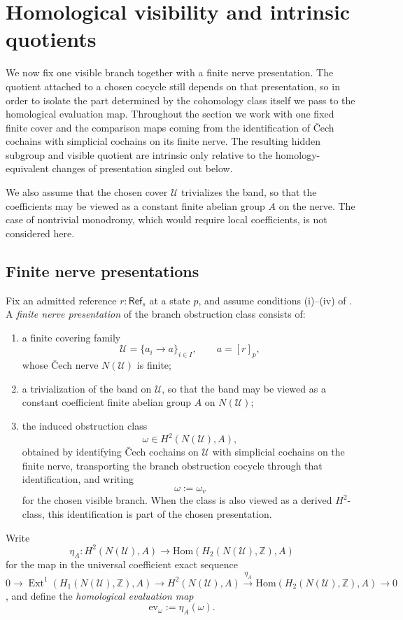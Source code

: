 \section{Homological visibility and intrinsic quotients}
\label{sec:homological-visibility}

We now fix one visible branch together with a finite nerve presentation. The quotient attached to a chosen cocycle still depends on that presentation, so in order to isolate the part determined by the cohomology class itself we pass to the homological evaluation map. Throughout the section we work with one fixed finite cover and the comparison maps coming from the identification of \v{C}ech cochains with simplicial cochains on its finite nerve. The resulting hidden subgroup and visible quotient are intrinsic only relative to the homology-equivalent changes of presentation singled out below.

We also assume that the chosen cover $\mathcal U$ trivializes the band, so that the coefficients may be viewed as a constant finite abelian group $A$ on the nerve. The case of nontrivial monodromy, which would require local coefficients, is not considered here.

\subsection{Finite nerve presentations}

\begin{definition}\label{def:finite-nerve-presentation}
Fix an admitted reference $r:\mathsf{Ref}_s$ at a state $p$, and assume conditions \textup{(i)}--\textup{(iv)} of . A \emph{finite nerve presentation} of the branch obstruction class consists of:
\begin{enumerate}[label=(\roman*),nosep]
\item a finite covering family
\[
\mathcal U=\{a_i\to a\}_{i\in I},
\qquad
a=[r]_p,
\]
whose \v{C}ech nerve $N(\mathcal U)$ is finite;
\item a trivialization of the band on $\mathcal U$, so that the band may be viewed as a constant coefficient finite abelian group $A$ on $N(\mathcal U)$;
\item the induced obstruction class
\[
\omega\in H^2(N(\mathcal U),A),
\]
obtained by identifying \v{C}ech cochains on $\mathcal U$ with simplicial cochains on the finite nerve, transporting the branch obstruction cocycle through that identification, and writing
\[
\omega:=\omega_v
\]
for the chosen visible branch. When the class is also viewed as a derived $H^2$-class, this identification is part of the chosen presentation.
\end{enumerate}
Write
\[
\eta_A:H^2(N(\mathcal U),A)\longrightarrow \mathrm{Hom}(H_2(N(\mathcal U),\mathbb Z),A)
\]
for the map in the universal coefficient exact sequence
\[
0\to \operatorname{Ext}^1(H_1(N(\mathcal U),\mathbb Z),A)\to H^2(N(\mathcal U),A)\xrightarrow{\eta_A}\mathrm{Hom}(H_2(N(\mathcal U),\mathbb Z),A)\to 0
\]
\cite[Sec.~3.1]{Hatcher2002}, and define the \emph{homological evaluation map}
\[
\mathrm{ev}_{\omega}:=\eta_A(\omega).
\]
\end{definition}

